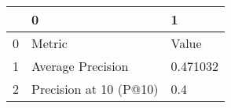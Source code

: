 \begin{tabular}{lll}
\toprule
{} &                       0 &         1 \\
\midrule
0 &                  Metric &     Value \\
1 &       Average Precision &  0.471032 \\
2 &  Precision at 10 (P@10) &       0.4 \\
\bottomrule
\end{tabular}
